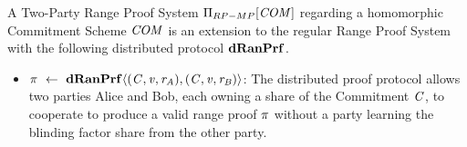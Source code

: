 \begin{definition}\label{def:pre:mp-rangeproof}
    A Two-Party Range Proof System $\Pi_{RP-MP}[\mathit{COM}]$ regarding a homomorphic Commitment Scheme $\mathit{COM}$ is an extension to the regular Range Proof System with the following
    distributed protocol $\mathbf{dRanPrf}$.
    \begin{itemize}
        \item $\pi ~\leftarrow~ \mathbf{dRanPrf} \langle(\mathit{C},\mathit{v},\mathit{r}_{\mathit{A}}),(\mathit{C},\mathit{v},\mathit{r}_{\mathit{B}})\rangle$: The distributed proof protocol allows two parties Alice and Bob, each owning a share of the
        Commitment $\mathit{C}$, to cooperate to produce a valid range proof $\pi$ without a party learning the blinding factor share from the other party.
    \end{itemize}
\end{definition}



